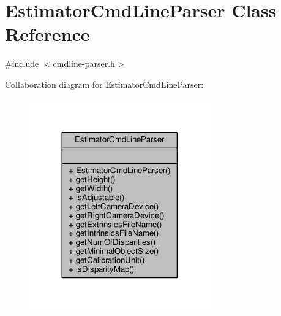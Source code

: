 \hypertarget{classEstimatorCmdLineParser}{}\section{Estimator\+Cmd\+Line\+Parser Class Reference}
\label{classEstimatorCmdLineParser}


{\ttfamily \#include $<$cmdline-\/parser.\+h$>$}



Collaboration diagram for Estimator\+Cmd\+Line\+Parser\+:
\nopagebreak
\begin{figure}[H]
\begin{center}
\leavevmode
\includegraphics[width=221pt]{classEstimatorCmdLineParser__coll__graph}
\end{center}
\end{figure}
